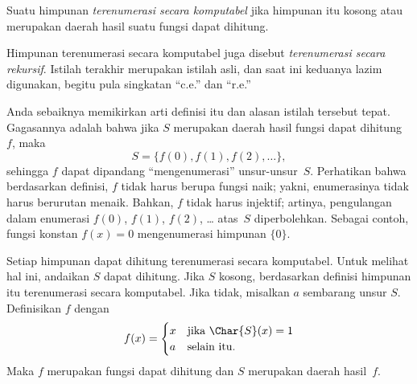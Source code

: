 \documentclass[../../../include/open-logic-section]{subfiles}
\begin{document}

\begin{defn}
Suatu himpunan \emph{terenumerasi secara komputabel} jika himpunan itu kosong
atau merupakan daerah hasil suatu fungsi dapat dihitung.
\end{defn}

\begin{history}
Himpunan terenumerasi secara komputabel juga disebut \emph{terenumerasi secara
  rekursif}. Istilah terakhir merupakan istilah asli, dan saat ini keduanya
lazim digunakan, begitu pula singkatan ``c.e.'' dan ``r.e.''
\end{history}

\begin{explain}
Anda sebaiknya memikirkan arti definisi itu dan alasan istilah tersebut tepat.
Gagasannya adalah bahwa jika $S$ merupakan daerah hasil fungsi dapat
dihitung~$f$, maka
\[
S = \{ f(0), f(1), f(2), \dots \},
\]
sehingga $f$ dapat dipandang ``mengenumerasi'' unsur-unsur~$S$. Perhatikan
bahwa berdasarkan definisi, $f$ tidak harus berupa fungsi naik; yakni,
enumerasinya tidak harus berurutan menaik. Bahkan, $f$ tidak harus injektif;
artinya, pengulangan dalam enumerasi $f(0)$, $f(1)$, $f(2)$, \dots{} atas~$S$
diperbolehkan. Sebagai contoh, fungsi konstan $f(x) = 0$ mengenumerasi
himpunan $\{ 0 \}$.
\end{explain}

Setiap himpunan dapat dihitung terenumerasi secara komputabel. Untuk melihat
hal ini, andaikan $S$ dapat dihitung. Jika $S$ kosong, berdasarkan definisi
himpunan itu terenumerasi secara komputabel. Jika tidak, misalkan $a$ sembarang
unsur $S$. Definisikan $f$ dengan
\[
f(x) =
\begin{cases}
x & \text{jika $\Char{S}(x) = 1$} \\
a & \text{selain itu.}
\end{cases}
\]
Maka $f$ merupakan fungsi dapat dihitung dan $S$ merupakan daerah hasil~$f$.
\end{document}
